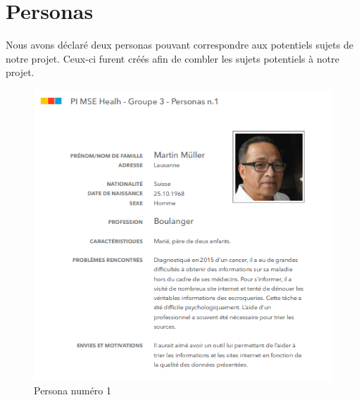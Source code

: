 \documentclass{ReportTemplate}
\begin{document}
\section{Personas}
Nous avons déclaré deux personas pouvant correspondre aux potentiels sujets de
notre projet. Ceux-ci furent créés afin de combler les sujets potentiels à notre projet.
\begin{figure}[H]
    \centering
    \includegraphics[width=\textwidth]{imageSources/Persona_1.png}
    \caption{Persona numéro 1}
    \label{fig:Persona1}
\end{figure}
\end{document}
